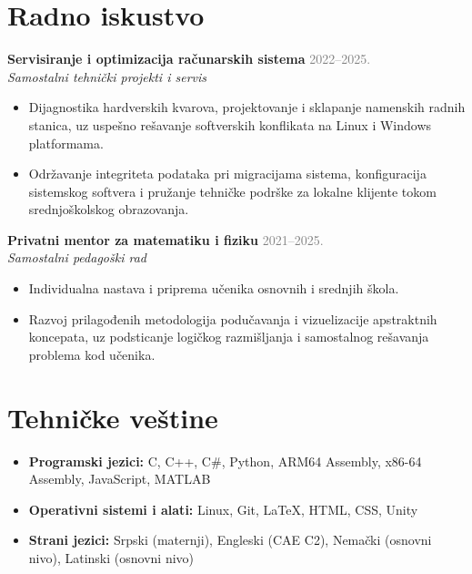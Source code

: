 \documentclass[10pt, letterpaper]{article}
\newcommand{\entry}[4]{
  \vspace{1.5ex}
  \noindent\textbf{#1} \hfill \textcolor{graytext}{\small #2} \\
  \noindent\textit{#3} \hfill \textcolor{graytext}{\small #4}
  \vspace{0.5ex}
}
\begin{document}
\vspace{2ex}

\section*{Radno iskustvo}
\entry{Servisiranje i optimizacija računarskih sistema}{2022--2025.}{Samostalni tehnički projekti i servis}{}
\begin{itemize}[leftmargin=1.5em, topsep=0.2ex, itemsep=0.2ex]
    \item Dijagnostika hardverskih kvarova, projektovanje i sklapanje namenskih radnih stanica, uz uspešno rešavanje softverskih konflikata na Linux i Windows platformama.
    \item Održavanje integriteta podataka pri migracijama sistema, konfiguracija sistemskog softvera i pružanje tehničke podrške za lokalne klijente tokom srednjoškolskog obrazovanja.
\end{itemize}
\entry{Privatni mentor za matematiku i fiziku}{2021--2025.}{Samostalni pedagoški rad}{}
\begin{itemize}[leftmargin=1.5em, topsep=0.2ex, itemsep=0.2ex]
    \item Individualna nastava i priprema učenika osnovnih i srednjih škola.
    \item Razvoj prilagođenih metodologija podučavanja i vizuelizacije apstraktnih koncepata, uz podsticanje logičkog razmišljanja i samostalnog rešavanja problema kod učenika.
\end{itemize}

\vspace{2ex}

\section*{Tehničke veštine}
\vspace{1ex}
\begin{itemize}[leftmargin=1.5em, topsep=2ex, itemsep=0.3ex]
    \item \textbf{Programski jezici:} C, C++, C\#, Python, ARM64 Assembly, x86-64 Assembly, JavaScript, MATLAB
    \item \textbf{Operativni sistemi i alati:} Linux, Git, \LaTeX, HTML, CSS, Unity
    \item \textbf{Strani jezici:} Srpski (maternji), Engleski (CAE C2), Nemački (osnovni nivo), Latinski (osnovni nivo)
\end{itemize}
\end{document}
